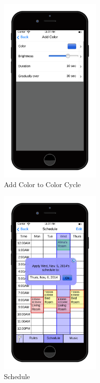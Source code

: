 \documentclass[12pt]{article}
\begin{document}
  \begin{figure}[ht!]
    \centering
    \includegraphics[width=50mm]{Add_Color.png}
    \caption{Add Color to Color Cycle}
    \label{fig:addColorCycle}
  \end{figure}
  
  \begin{figure}[ht!]
    \centering
    \includegraphics[width=50mm]{Schedule.png}
    \caption{Schedule}
    \label{fig:schedule}
  \end{figure}
  
\end{document}
